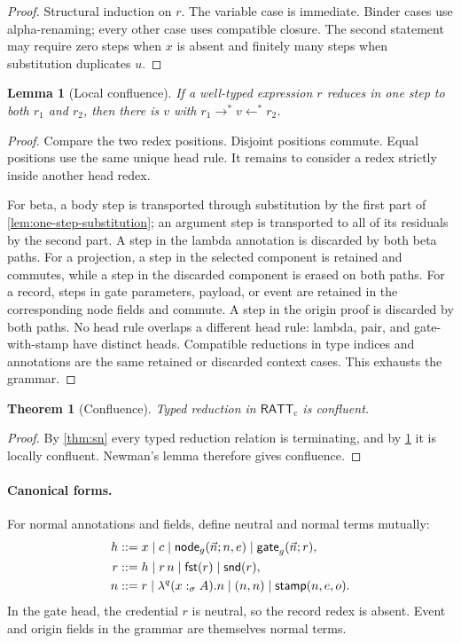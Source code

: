 \documentclass[11pt]{article}
\numberwithin{equation}{section}
\theoremstyle{definition}
\theoremstyle{plain}
\newtheorem{theorem}[definition]{Theorem}
\newtheorem{lemma}[definition]{Lemma}
\theoremstyle{remark}
\newcommand{\RATT}{\mathsf{RATT}_{\mathrm c}}
\newcommand{\fst}{\AFFst}
\newcommand{\snd}{\AFSnd}
\begin{document}
\begin{proof}
Structural induction on \(r\).  The variable case is immediate.  Binder
cases use alpha-renaming; every other case uses compatible closure.  The
second statement may require zero steps when \(x\) is absent and finitely many
steps when substitution duplicates \(u\).
\end{proof}

\begin{lemma}[Local confluence]\label{lem:local-confluence}
If a well-typed expression \(r\) reduces in one step to both \(r_1\) and
\(r_2\), then there is \(v\) with
\(r_1\longrightarrow^*v\longleftarrow^*r_2\).
\end{lemma}

\begin{proof}
Compare the two redex positions.  Disjoint positions commute.  Equal
positions use the same unique head rule.  It remains to consider a redex
strictly inside another head redex.

For beta, a body step is transported through substitution by the first part
of \cref{lem:one-step-substitution}; an argument step is transported to all
of its residuals by the second part.  A step in the lambda annotation is
discarded by both beta paths.  For a projection, a step in the selected
component is retained and commutes, while a step in the discarded component
is erased on both paths.  For a record, steps in gate parameters, payload,
or event are retained in the corresponding node fields and commute.  A step
in the origin proof is discarded by both paths.  No head rule overlaps a
different head rule: lambda, pair, and gate-with-stamp have distinct heads.
Compatible reductions in type indices and annotations are the same retained
or discarded context cases.  This exhausts the grammar.
\end{proof}

\begin{theorem}[Confluence]\label{thm:confluence}
Typed reduction in \(\RATT\) is confluent.
\end{theorem}

\begin{proof}
By \cref{thm:sn} every typed reduction relation is terminating, and by
\cref{lem:local-confluence} it is locally confluent.  Newman's lemma therefore
gives confluence.
\end{proof}

\paragraph{Canonical forms.}
For normal annotations and fields, define neutral and normal terms mutually:
\begin{align*}
 h ::={}&x\mid c\mid
   \mathsf{node}_g(\vec n;n,e)\mid
   \mathsf{gate}_g(\vec n;r),\\
 r ::={}&h\mid r\,n\mid\fst(r)\mid\snd(r),\\
 n ::={}&r\mid\lambda^q(x:_{\sigma}A).n
       \mid(n,n)\mid\mathsf{stamp}(n,e,o).
\end{align*}
In the gate head, the credential \(r\) is neutral, so the record redex is
absent.  Event and origin fields in the grammar are themselves normal terms.
\end{document}
